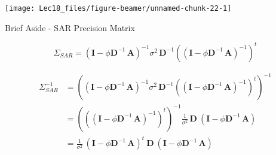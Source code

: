 \documentclass[11pt,ignorenonframetext,]{beamer}
\begin{document}
\begin{frame}{}
\protect\hypertarget{section-3}{}

\begin{center}\texttt{[image: Lec18\_files/figure-beamer/unnamed-chunk-22-1]} \end{center}

\end{frame}

\begin{frame}{Brief Aside - SAR Precision Matrix}
\protect\hypertarget{brief-aside---sar-precision-matrix}{}

\[ 
\Sigma_{SAR} = (\symbf{I}-\phi \symbf{D}^{-1} \, \symbf{A})^{-1} \sigma^2 \, \symbf{D}^{-1} \left((\symbf{I}-\phi \symbf{D}^{-1} \, \symbf{A})^{-1}\right)^t
\]

\vspace{6mm}

\[ \begin{aligned}
\Sigma^{-1}_{SAR} 
  &= \left( (\symbf{I}-\phi \symbf{D}^{-1} \, \symbf{A})^{-1} \sigma^2 \, \symbf{D}^{-1} \left((\symbf{I}-\phi \symbf{D}^{-1} \, \symbf{A})^{-1}\right)^t \right)^{-1} \\
  &= \left( \left( (\symbf{I}-\phi \symbf{D}^{-1} \, \symbf{A})^{-1}\right)^t\right)^{-1} \frac{1}{\sigma^2} \, \symbf{D} ~ (\symbf{I}-\phi \symbf{D}^{-1} \, \symbf{A}) \\
  &= \frac{1}{\sigma^2} \, (\symbf{I}-\phi \symbf{D}^{-1} \, \symbf{A})^t ~ \symbf{D} ~ (\symbf{I}-\phi \symbf{D}^{-1} \, \symbf{A}) \\
\end{aligned}\]

\end{frame}
\end{document}
